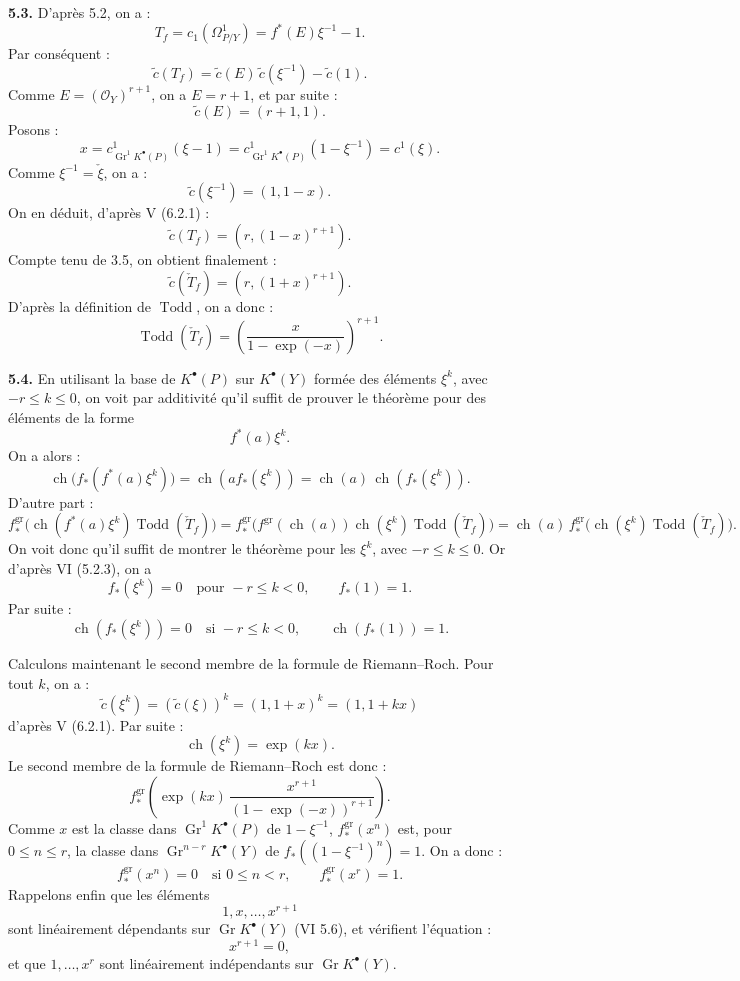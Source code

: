 \documentclass[11pt]{article}
\newcommand{\Gr}{\operatorname{Gr}}
\newcommand{\ch}{\operatorname{ch}}
\newcommand{\Todd}{\operatorname{Todd}}
\providecommand{\ch}{\operatorname{ch}}
\providecommand{\Todd}{\operatorname{Todd}}
\providecommand{\Gr}{\operatorname{Gr}}
\providecommand{\Gr}{\operatorname{G}}
\begin{document}
\textbf{5.3.} D'après 5.2, on a :
\[
 T_f=c_1(\Omega^1_{P/Y})=f^*(E)\xi^{-1}-1.
\]
Par conséquent :
\[
 \widetilde c(T_f)=\widetilde c(E)\,\widetilde c(\xi^{-1})-\widetilde c(1).
\]
Comme \(E=(\mathcal O_Y)^{r+1}\), on a \(E=r+1\), et par suite :
\[
 \widetilde c(E)=(r+1,1).
\]
Posons :
\[
 x=c^1_{\Gr^1K^{\bullet}(P)}(\xi-1)
 =
 c^1_{\Gr^1K^{\bullet}(P)}(1-\xi^{-1})
 =
 c^1(\xi).
\]
Comme \(\xi^{-1}=\check \xi\), on a :
\[
 \widetilde c(\xi^{-1})=(1,1-x).
\]
On en déduit, d'après V (6.2.1) :
\[
 \widetilde c(T_f)=(r,(1-x)^{r+1}).
\]
Compte tenu de 3.5, on obtient finalement :
\[
 \widetilde c(\check T_f)=(r,(1+x)^{r+1}).
\]
D'après la définition de \(\Todd\), on a donc :
\begin{equation}\tag{5.3.1}
 \Todd(\check T_f)=
 \left(\frac{x}{1-\exp(-x)}\right)^{r+1}.
\end{equation}

\textbf{5.4.} En utilisant la base de \(K^{\bullet}(P)\) sur \(K^{\bullet}(Y)\) formée des éléments \(\xi^k\), avec \(-r\leq k\leq0\), on voit par additivité qu'il suffit de prouver le théorème pour des éléments de la forme
\[
 f^*(a)\xi^k.
\]
On a alors :
\[
 \ch\bigl(f_*(f^*(a)\xi^k)\bigr)
 =
 \ch(a f_*(\xi^k))
 =
 \ch(a)\,\ch(f_*(\xi^k)).
\]
D'autre part :
\[
 f^{\mathrm{gr}}_*\bigl(\ch(f^*(a)\xi^k)\Todd(\check T_f)\bigr)
 =
 f^{\mathrm{gr}}_*\bigl(f^{\mathrm{gr}}(\ch(a))\ch(\xi^k)\Todd(\check T_f)\bigr)
 =
 \ch(a)\,f^{\mathrm{gr}}_*\bigl(\ch(\xi^k)\Todd(\check T_f)\bigr).
\]
On voit donc qu'il suffit de montrer le théorème pour les \(\xi^k\), avec \(-r\leq k\leq0\). Or d'après VI (5.2.3), on a
\[
 f_*(\xi^k)=0\quad\text{pour }-r\leq k<0,\qquad f_*(1)=1.
\]
Par suite :
\begin{equation}\tag{5.4.1}
 \ch(f_*(\xi^k))=0\quad\text{si }-r\leq k<0,\qquad
 \ch(f_*(1))=1.
\end{equation}

Calculons maintenant le second membre de la formule de Riemann--Roch. Pour tout \(k\), on a :
\[
 \widetilde c(\xi^k)=(\widetilde c(\xi))^k=(1,1+x)^k=(1,1+kx)
\]
d'après V (6.2.1). Par suite :
\begin{equation}\tag{5.4.2}
 \ch(\xi^k)=\exp(kx).
\end{equation}
Le second membre de la formule de Riemann--Roch est donc :
\begin{equation}\tag{5.4.3}
 f^{\mathrm{gr}}_*\left(\exp(kx)\,
 \frac{x^{r+1}}{(1-\exp(-x))^{r+1}}\right).
\end{equation}
Comme \(x\) est la classe dans \(\Gr^1K^{\bullet}(P)\) de \(1-\xi^{-1}\), \(f^{\mathrm{gr}}_*(x^n)\) est, pour \(0\leq n\leq r\), la classe dans
\(\Gr^{n-r}K^{\bullet}(Y)\) de \(f_*((1-\xi^{-1})^n)=1\). On a donc :
\begin{equation}\tag{5.4.4}
 f^{\mathrm{gr}}_*(x^n)=0\quad\text{si }0\leq n<r,\qquad
 f^{\mathrm{gr}}_*(x^r)=1.
\end{equation}
Rappelons enfin que les éléments
\[
1,x,\ldots,x^{r+1}
\]
sont linéairement dépendants sur \(\Gr K^{\bullet}(Y)\) (VI 5.6), et vérifient l'équation :
\begin{equation}\tag{5.4.5}
 x^{r+1}=0,
\end{equation}
et que \(1,\ldots,x^r\) sont linéairement indépendants sur \(\Gr K^{\bullet}(Y)\).
\end{document}

